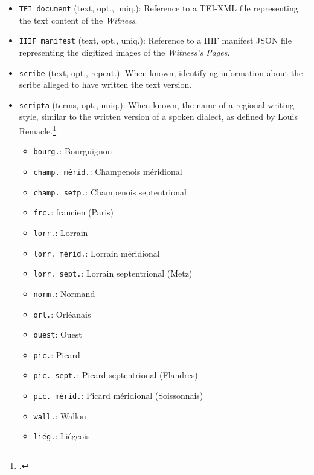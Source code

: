 \begin{itemize}
    \item \texttt{TEI document} (text, opt., uniq.): Reference to a TEI-XML file representing the text content of the \textit{Witness}.
    \item \texttt{IIIF manifest} (text, opt., uniq.): Reference to a IIIF manifest JSON file representing the digitized images of the \textit{Witness's} \textit{Pages}.
    \item \texttt{scribe} (text, opt., repeat.): When known, identifying information about the scribe alleged to have written the text version.
    \item \texttt{scripta} (terms, opt., uniq.): When known, the name of a regional writing style, similar to the written version of a spoken dialect, as defined by Louis Remacle.\footcite[``Je désigne la langue vulgaire écrite au moyen âge par le néologisme \textit{scripta}. L'expression `la scripta' est synonyme de l'allemand `die Schriftsprache.'''][24]{Remacle1948}
    \begin{multicols}{2}
        \begin{itemize}
            \item \texttt{bourg.}: Bourguignon
            \item \texttt{champ. mérid.}: Champenois méridional
            \item \texttt{champ. setp.}: Champenois septentrional
            \item \texttt{frc.}: francien (Paris)
            \item \texttt{lorr.}: Lorrain
            \item \texttt{lorr. mérid.}: Lorrain méridional
            \item \texttt{lorr. sept.}: Lorrain septentrional (Metz)
            \item \texttt{norm.}: Normand
            \item \texttt{orl.}: Orléanais
            \item \texttt{ouest}: Ouest
            \item \texttt{pic.}: Picard
            \item \texttt{pic. sept.}: Picard septentrional (Flandres)
            \item \texttt{pic. mérid.}: Picard méridional (Soissonnais)
            \item \texttt{wall.}: Wallon
            \item \texttt{liég.}: Liégeois
        \end{itemize}
    \end{multicols}

\end{itemize}
